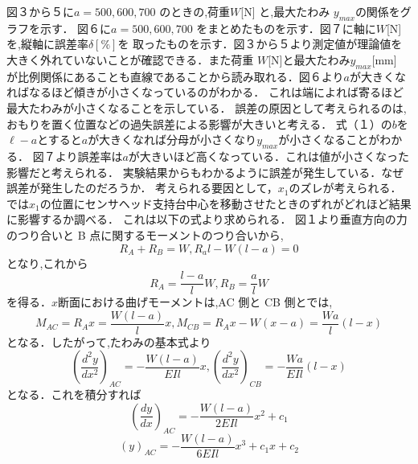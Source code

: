 \documentclass[a4paper,11pt]{jsarticle}
\begin{document}
\begin{enumerate}
        \quad 図３から５に$a = 500,600,700$ のときの,荷重$ W $[N] と,最大たわみ $y_{max}$の関係をグラフを示す．
        図６に$a = 500,600,700$ をまとめたものを示す．図７に軸に$ W$[N]を,縦軸に誤差率$ \delta [\%]$を
        取ったものを示す．図３から５より測定値が理論値を大きく外れていないことが確認できる．また荷重 $W $[N]と最大たわみ$ y_{max}$[mm]
        が比例関係にあることも直線であることから読み取れる．図６より$a$が大きくなればなるほど傾きが小さくなっているのがわかる．
        これは端によれば寄るほど最大たわみが小さくなることを示している．
        誤差の原因として考えられるのは,おもりを置く位置などの過失誤差による影響が大きいと考える．
        式（１）の$b$を$\ell-a$とすると$a$が大きくなれば分母が小さくなり$y_{max}$が小さくなることがわかる．
        図７より誤差率は$a$が大きいほど高くなっている．これは値が小さくなった影響だと考えられる．
        実験結果からもわかるように誤差が発生している．なぜ誤差が発生したのだろうか．
        考えられる要因として，$x_1$のズレが考えられる．
        では$x_1$の位置にセンサヘッド支持台中心を移動させたときのずれがどれほど結果に影響するか調べる．
        これは以下の式より求められる．
        図１より垂直方向の力のつり合いと B 点に関するモーメントのつり合いから,
        \begin{equation}
          R_A+R_B=W,R_al-W(l-a)=0
        \end{equation}
        となり,これから
        \begin{equation}
          R_A={\dfrac{l-a}{l}W},R_B={\dfrac{a}{l}W}
        \end{equation}
        を得る．$x$断面における曲げモーメントは,AC 側と CB 側とでは,
        \begin{equation}
          M_{AC}=R_Ax={\dfrac{W(l-a)}{l}x},M_{CB}=R_Ax-W(x-a)={\dfrac{Wa}{l}(l-x)}
        \end{equation}
        となる．したがって,たわみの基本式より
        \begin{equation}
          {(\dfrac{d^2y}{dx^2})_{AC}}={-\dfrac{W(l-a)}{EIl}x},
          {(\dfrac{d^2y}{dx^2})_{CB}}={-\dfrac{Wa}{EIl}(l-x)}
        \end{equation}
        となる．これを積分すれば
        \begin{equation}
          {(\dfrac{dy}{dx})_{AC}}={-\dfrac{W(l-a)}{2EIl}x^2+c_1}
        \end{equation}
        \begin{equation}
          {(y)_{AC}}={-\dfrac{W(l-a)}{6EIl}x^3+c_1x+c_2}
        \end{equation}
        \begin{equation}

\end{equation}
\end{enumerate}
\end{document}
